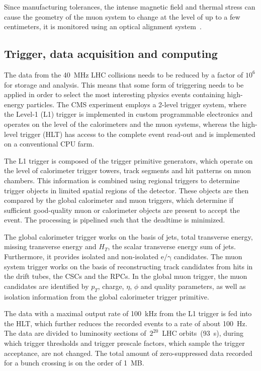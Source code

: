 Since manufacturing tolerances, the intense magnetic field and thermal stress can cause the geometry of the muon system to change at the level of up to a few centimeters, it is monitored using an optical alignment system~\cite{Chatrchyan:2009sr}. 

\subsection{Trigger, data acquisition and computing}
The data from the 40~MHz LHC collisions needs to be reduced by a factor of $10^6$ for storage and analysis. This means that some form of triggering needs to be applied in order to select the most interesting physics events containing high-energy particles. The CMS experiment employs a 2-level trigger system, where the Level-1 (L1) trigger is implemented in custom programmable electronics and operates on the level of the calorimeters and the muon systems, whereas the high-level trigger (HLT) has access to the complete event read-out and is implemented on a conventional CPU farm.

The L1 trigger is composed of the trigger primitive generators, which operate on the level of calorimeter trigger towers, track segments and hit patterns on muon chambers.  This information is combined using regional triggers to determine trigger objects in limited spatial regions of the detector. These objects are then compared by the global calorimeter and muon triggers, which determine if sufficient good-quality muon or calorimeter objects are present to accept the event. The processing is pipelined such that the deadtime is minimized.

The global calorimeter trigger works on the basis of jets, total transverse energy, missing transverse energy and $H_T$, the scalar transverse energy sum of jets. Furthermore, it provides isolated and non-isolated $\mathrm{e}/\mathrm{\gamma}$ candidates. The muon system trigger works on the basis of reconstructing track candidates from hits in the drift tubes, the CSCs and the RPCs. In the global muon trigger, the muon candidates are identified by $p_T$, charge, $\eta$, $\phi$ and quality parameters, as well as isolation information from the global calorimeter trigger primitive.

The data with a maximal output rate of 100~kHz from the L1 trigger is fed into the HLT, which further reduces the recorded events to a rate of about 100~Hz. The data are divided to luminosity sections of~$2^{20}$~LHC orbits~(93~s), during which trigger thresholds and trigger prescale factors, which sample the trigger acceptance, are not changed. The total amount of zero-suppressed data recorded for a bunch crossing is on the order of 1~MB.

